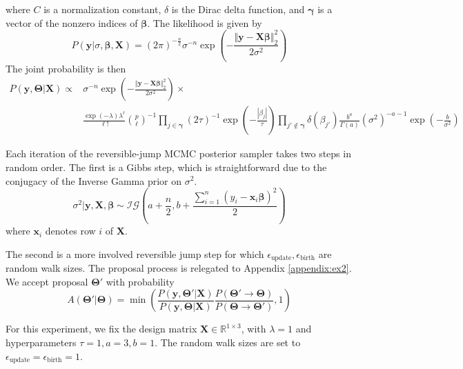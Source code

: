 \documentclass[a4paper,12pt]{article}
\begin{document}
where $C$ is a normalization constant, $\delta$ is the Dirac delta function, and $\mathbf{\gamma}$ is a vector of the nonzero indices of $\mathbf{\beta}$.
The likelihood is given by
\begin{equation}
  P(\mathbf{y} | \sigma, \mathbf{\beta}, \mathbf{X} ) = (2\pi)^{-\frac{n}{2}} \sigma^{-n} \exp{\left(-\frac{\Vert\mathbf{y}-\mathbf{X}\mathbf{\beta}\Vert^{2}_{2}}{2\sigma^{2}}\right)}
\end{equation}
The joint probability is then
\begin{equation}
    \begin{aligned}
         P(\mathbf{y}, \mathbf{\Theta} | \mathbf{X} ) \propto &\sigma^{-n} \exp{\left(-\frac{\Vert\mathbf{y}-\mathbf{X}\mathbf{\beta}\Vert^{2}_{2}}{2\sigma^{2}}\right)} \times \\ 
         & \frac{\exp{(-\lambda)} \lambda^{\ell}}{\ell!} {p\choose \ell}^{-1} \prod_{j\in \mathbf{\gamma}} (2\tau)^{-1}\exp\left(-\frac{|\beta_{j}|}{\tau}\right) \prod_{j' \notin \mathbf{\gamma}} \delta(\beta_{j'}) \frac{b^{a}}{\Gamma(a)} (\sigma^{2})^{-a-1} \exp{\left(-\frac{b}{\sigma^{2}}\right)}
    \end{aligned}
    \label{eq:ex2_joint}
\end{equation}

Each iteration of the reversible-jump MCMC posterior sampler takes two steps in random order. The first is a Gibbs step, which is straightforward due to the conjugacy of the Inverse Gamma prior on $\sigma^{2}$.
\begin{equation}
    \sigma^{2} | \mathbf{y}, \mathbf{X}, \mathbf{\beta} \sim \mathcal{IG}\left(a + \frac{n}{2}, b + \frac{\sum_{i=1}^{n}(y_{i}-\mathbf{x}_{i}\mathbf{\beta})^{2} }{2}\right)
\end{equation}
where $\mathbf{x}_{i}$ denotes row $i$ of $\mathbf{X}$.

The second is a more involved reversible jump step for which $\epsilon_{\text{update}}, \epsilon_{\text{birth}}$ are random walk sizes. The proposal process is relegated to Appendix \ref{appendix:ex2}. We accept proposal $\mathbf{\Theta}'$ with probability $$A(\mathbf{\Theta}'|\mathbf{\Theta}) = \min{\left(\frac{P(\mathbf{y}, \mathbf{\Theta'} | \mathbf{X} )}{P(\mathbf{y}, \mathbf{\Theta} | \mathbf{X} )} \frac{P(\mathbf{\Theta}' \rightarrow \mathbf{\Theta})}{P(\mathbf{\Theta} \rightarrow \mathbf{\Theta}')}, 1\right)}$$

For this experiment, we fix the design matrix $\mathbf{X} \in \mathbb{R}^{1 \times 3}$, with $\lambda=1$ and hyperparameters $\tau=1, a=3, b=1$. The random walk sizes are set to $\epsilon_\text{update}= \epsilon_\text{birth}=1$.
\end{document}
